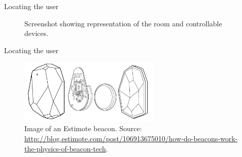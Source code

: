 \begin{frame}{Locating the user}{}
\centering
\begin{figure}[!htb]%
    \caption{Screenshot showing representation of the room and controllable devices.}
\label{fig:prototype3-room-screenshot}
\end{figure}
\end{frame}

\begin{frame}{Locating the user}{}
\begin{figure}[!htb]
  \includegraphics[width=0.6\textwidth]{../images/estimotebeacon}
  \caption{Image of an Estimote beacon. Source: \protect\url{http://blog.estimote.com/post/106913675010/how-do-beacons-work-the-physics-of-beacon-tech}.}
  \label{fig:estimotebeacon}
\end{figure}
\end{frame}
